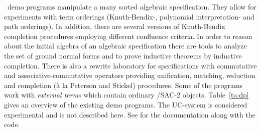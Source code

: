 \redux\  demo programs manipulate a many sorted algebraic specification.
They allow for experiments with term orderings (Knuth-Bendix-,
polynomial interpretation- and path orderings).
In addition, there are several versions of Knuth-Bendix completion procedures
employing different confluence criteria.
In order to reason about the initial algebra of an algebraic specification
there are tools to analyze the set of ground normal forms and to prove
inductive theorems by inductive completion.
There is also a rewrite laboratory for specifications with commutative and
associative-commutative operators providing unification, matching, reduction 
and completion (\`{a} la Peterson and Stickel) procedures.
Some of the programs work with {\em external terms} which contain ordinary 
\ALDES/SAC-2 objects.
Table~\ref{ta:dp} gives an overview of the existing demo programs.
The UC-system is considered experimental and is not described here.
See for the documentation along with the code.
